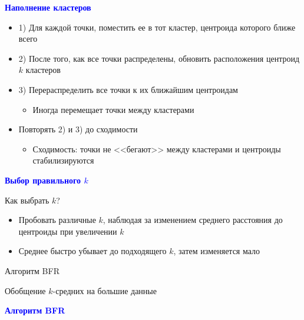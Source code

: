 \documentclass[landscape]{slides}
\begin{document}
\begin{normalsize}
\begin{slide}
\textbf{\textcolor{blue}{Наполнение кластеров}}

\begin{itemize}
\item 1) Для каждой точки, поместить ее в тот кластер, центроида которого ближе всего
\item 2) После того, как все точки распределены, обновить расположения центроид $k$ кластеров
\item 3) Перераспределить все точки к их ближайшим центроидам
  \begin{itemize}
  \item Иногда перемещает точки между кластерами
  \end{itemize}
\item Повторять 2) и 3) до сходимости
  \begin{itemize}
  \item Сходимость: точки не <<бегают>> между кластерами и центроиды стабилизируются
  \end{itemize}
\end{itemize}
\end{slide}



\begin{slide}
\textbf{\textcolor{blue}{Выбор правильного $k$}}

Как выбрать $k$?
\begin{itemize}
\item Пробовать различные $k$, наблюдая за изменением среднего расстояния до центроиды при увеличении $k$
\item Среднее быстро убывает до подходящего $k$, затем изменяется мало
\end{itemize}
\end{slide}


\begin{slide}
Алгоритм BFR

Обобщение $k$-средних на большие данные
\end{slide}


\begin{slide}
\textbf{\textcolor{blue}{Алгоритм BFR}}


\end{slide}
\end{normalsize}
\end{document}
